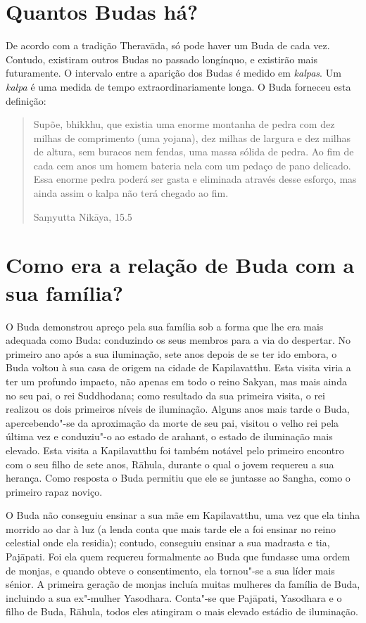 \section{Quantos Budas há?}

De acordo com a tradição Theravāda, só pode haver um Buda de cada vez.
Contudo, existiram outros Budas no passado longínquo, e existirão mais
futuramente. O intervalo entre a aparição dos Budas é medido em
\emph{kalpas}. Um \emph{kalpa} é uma medida de tempo extraordinariamente
longa. O Buda forneceu esta definição:

\begin{verse}
Supõe, bhikkhu, que existia uma enorme montanha de pedra com
dez milhas de comprimento (uma yojana), dez milhas de largura e dez
milhas de altura, sem buracos nem fendas, uma massa sólida de pedra. Ao
fim de cada cem anos um homem bateria nela com um pedaço de pano
delicado. Essa enorme pedra poderá ser gasta e eliminada através desse
esforço, mas ainda assim o kalpa não terá chegado ao fim.

{\raggedleft
  Saṃyutta Nikāya, 15.5
\par}
\end{verse}

\section{Como era a relação de Buda com a sua família?}

O Buda demonstrou apreço pela sua família sob a forma que lhe era mais
adequada como Buda: conduzindo os seus membros para a via do despertar.
No primeiro ano após a sua iluminação, sete anos depois de se ter ido
embora, o Buda voltou à sua casa de origem na cidade de Kapilavatthu.
Esta visita viria a ter um profundo impacto, não apenas em todo o reino
Sakyan, mas mais ainda no seu pai, o rei Suddhodana; como resultado da
sua primeira visita, o rei realizou os dois primeiros níveis de
iluminação. Alguns anos mais tarde o Buda, apercebendo"-se da aproximação
da morte de seu pai, visitou o velho rei pela última vez e conduziu"-o ao
estado de arahant, o estado de iluminação mais elevado. Esta visita a
Kapilavatthu foi também notável pelo primeiro encontro com o seu filho
de sete anos, Rāhula, durante o qual o jovem requereu a sua herança.
Como resposta o Buda permitiu que ele se juntasse ao Sangha, como o
primeiro rapaz noviço.

O Buda não conseguiu ensinar a sua mãe em Kapilavatthu, uma vez que ela
tinha morrido ao dar à luz (a lenda conta que mais tarde ele a foi
ensinar no reino celestial onde ela residia); contudo, conseguiu ensinar
a sua madrasta e tia, Pajāpati. Foi ela quem requereu formalmente ao
Buda que fundasse uma ordem de monjas, e quando obteve o consentimento,
ela tornou"-se a sua líder mais sénior. A primeira geração de monjas
incluía muitas mulheres da família de Buda, incluindo a sua ex"-mulher
Yasodhara. Conta"-se que Pajāpati, Yasodhara e o filho de Buda, Rāhula,
todos eles atingiram o mais elevado estádio de iluminação.

